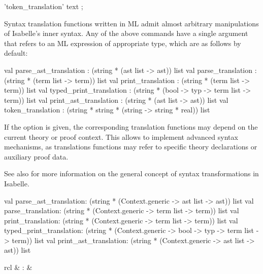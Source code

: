 \begin{isabellebody}
\begin{isamarkuptext}
\begin{rail}
  'token\_translation' text
  ;
  \end{rail}

  Syntax translation functions written in ML admit almost arbitrary
  manipulations of Isabelle's inner syntax.  Any of the above commands
  have a single  argument that refers to an ML
  expression of appropriate type, which are as follows by default:

\begin{ttbox}
val parse_ast_translation   : (string * (ast list -> ast)) list
val parse_translation       : (string * (term list -> term)) list
val print_translation       : (string * (term list -> term)) list
val typed_print_translation :
  (string * (bool -> typ -> term list -> term)) list
val print_ast_translation   : (string * (ast list -> ast)) list
val token_translation       :
  (string * string * (string -> string * real)) list
\end{ttbox}

  If the  option is given, the corresponding
  translation functions may depend on the current theory or proof
  context.  This allows to implement advanced syntax mechanisms, as
  translations functions may refer to specific theory declarations or
  auxiliary proof data.

  See also \cite[\S8]{isabelle-ref} for more information on the
  general concept of syntax transformations in Isabelle.

\begin{ttbox}
val parse_ast_translation:
  (string * (Context.generic -> ast list -> ast)) list
val parse_translation:
  (string * (Context.generic -> term list -> term)) list
val print_translation:
  (string * (Context.generic -> term list -> term)) list
val typed_print_translation:
  (string * (Context.generic -> bool -> typ -> term list -> term)) list
val print_ast_translation:
  (string * (Context.generic -> ast list -> ast)) list
\end{ttbox}%
\end{isamarkuptext}%
\isamarkuptrue%
%
\isamarkuptrue%
%
\begin{isamarkuptext}%
\begin{matharray}{rcl}
    \mbox{} & : &  \\
  \end{matharray}


\end{isamarkuptext}
\end{isabellebody}
